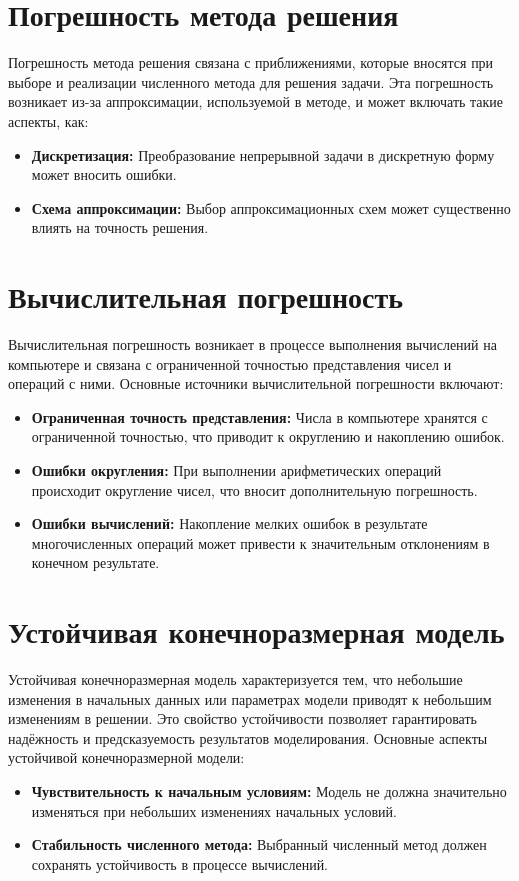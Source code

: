 \documentclass{article}
\begin{document}
\section{Погрешность метода решения}
Погрешность метода решения связана с приближениями, которые вносятся при выборе и реализации численного метода для решения задачи. Эта погрешность возникает из-за аппроксимации, используемой в методе, и может включать такие аспекты, как:
\begin{itemize}
    \item \textbf{Дискретизация:} Преобразование непрерывной задачи в дискретную форму может вносить ошибки.
    \item \textbf{Схема аппроксимации:} Выбор аппроксимационных схем может существенно влиять на точность решения.
\end{itemize}

\section{Вычислительная погрешность}
Вычислительная погрешность возникает в процессе выполнения вычислений на компьютере и связана с ограниченной точностью представления чисел и операций с ними. Основные источники вычислительной погрешности включают:
\begin{itemize}
    \item \textbf{Ограниченная точность представления:} Числа в компьютере хранятся с ограниченной точностью, что приводит к округлению и накоплению ошибок.
    \item \textbf{Ошибки округления:} При выполнении арифметических операций происходит округление чисел, что вносит дополнительную погрешность.
    \item \textbf{Ошибки вычислений:} Накопление мелких ошибок в результате многочисленных операций может привести к значительным отклонениям в конечном результате.
\end{itemize}
\section{Устойчивая конечноразмерная модель}
Устойчивая конечноразмерная модель характеризуется тем, что небольшие изменения в начальных данных или параметрах модели приводят к небольшим изменениям в решении. Это свойство устойчивости позволяет гарантировать надёжность и предсказуемость результатов моделирования. Основные аспекты устойчивой конечноразмерной модели:
\begin{itemize}
    \item \textbf{Чувствительность к начальным условиям:} Модель не должна значительно изменяться при небольших изменениях начальных условий.
    \item \textbf{Стабильность численного метода:} Выбранный численный метод должен сохранять устойчивость в процессе вычислений.
\end{itemize}
\end{document}

